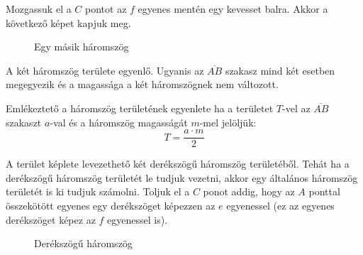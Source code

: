 \documentclass[11pt, a4paper]{article}
\begin{document}
Mozgassuk el a $C$ pontot az $f$ egyenes ment\'en egy kevesset balra. Akkor a következ\H{o} k\'epet kapjuk meg. 

\begin{figure}[h]
\centering
{}
\caption{Egy m\'asik h\'aromszög}
\label{fig:tri1}
\end{figure}

A k\'et h\'aromszög területe egyenl\H{o}. Ugyanis az $\overline{AB}$ szakasz mind k\'et esetben megegyezik \'es a magass\'aga a k\'et h\'aromszögnek nem v\'altozott.

Eml\'ekeztet\H{o} a h\'aromszög terület\'enek egyenlete ha a területet $T$-vel az $\overline{AB}$ szakaszt $a$-val \'es a h\'aromszög magass\'ag\'at $m$-mel jelöljük:
\[
    T=\frac{a\cdot m}{2}
\]

A terület k\'eplete levezethet\H{o} k\'et der\'ekszög\H{u} h\'aromszög terület\'eb\H{o}l. Teh\'at ha a der\'ekszög\H{u} h\'aromszög terület\'et le tudjuk vezetni, akkor egy \'altal\'anos h\'aromszög terület\'et is ki tudjuk sz\'amolni. Toljuk el a $C$ ponot addig, hogy az $A$ ponttal összekötött egyenes egy der\'ekszöget k\'epezzen az $e$ egyenessel (ez az egyenes der\'ekszöget k\'epez az $f$ egyenessel is).

\begin{figure}[h]
\centering
{}
\caption{Der\'ekszög\H{u} h\'aromszög}
\label{fig:tri1}
\end{figure}
\end{document}
